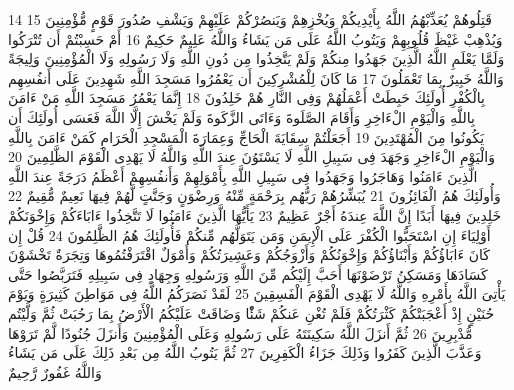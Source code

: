 \documentclass[20pt,a4paper]{article}
\begin{document}
{\tiny\colorbox{cl_aya}{14}} قَتِلُوهُمْ يُعَذِّبْهُمُ اللَّهُ بِأَيْدِيكُمْ وَيُخْزِهِمْ وَيَنصُرْكُمْ عَلَيْهِمْ وَيَشْفِ صُدُورَ قَوْمٍ مُّؤْمِنِينَ
{\tiny\colorbox{cl_aya}{15}} وَيُذْهِبْ غَيْظَ قُلُوبِهِمْ وَيَتُوبُ اللَّهُ عَلَى مَن يَشَاءُ وَاللَّهُ عَلِيمٌ حَكِيمٌ
{\tiny\colorbox{cl_aya}{16}} أَمْ حَسِبْتُمْ أَن تُتْرَكُوا وَلَمَّا يَعْلَمِ اللَّهُ الَّذِينَ جَهَدُوا مِنكُمْ وَلَمْ يَتَّخِذُوا مِن دُونِ اللَّهِ وَلَا رَسُولِهِ وَلَا الْمُؤْمِنِينَ وَلِيجَةً وَاللَّهُ خَبِيرٌ بِمَا تَعْمَلُونَ
{\tiny\colorbox{cl_aya}{17}} مَا كَانَ لِلْمُشْرِكِينَ أَن يَعْمُرُوا مَسَجِدَ اللَّهِ شَهِدِينَ عَلَى أَنفُسِهِم بِالْكُفْرِ أُولَئِكَ حَبِطَتْ أَعْمَلُهُمْ وَفِى النَّارِ هُمْ خَلِدُونَ
{\tiny\colorbox{cl_aya}{18}} إِنَّمَا يَعْمُرُ مَسَجِدَ اللَّهِ مَنْ ءَامَنَ بِاللَّهِ وَالْيَوْمِ الْءَاخِرِ وَأَقَامَ الصَّلَوةَ وَءَاتَى الزَّكَوةَ وَلَمْ يَخْشَ إِلَّا اللَّهَ فَعَسَى أُولَئِكَ أَن يَكُونُوا مِنَ الْمُهْتَدِينَ
{\tiny\colorbox{cl_aya}{19}} أَجَعَلْتُمْ سِقَايَةَ الْحَاجِّ وَعِمَارَةَ الْمَسْجِدِ الْحَرَامِ كَمَنْ ءَامَنَ بِاللَّهِ وَالْيَوْمِ الْءَاخِرِ وَجَهَدَ فِى سَبِيلِ اللَّهِ لَا يَسْتَوُنَ عِندَ اللَّهِ وَاللَّهُ لَا يَهْدِى الْقَوْمَ الظَّلِمِينَ
{\tiny\colorbox{cl_aya}{20}} الَّذِينَ ءَامَنُوا وَهَاجَرُوا وَجَهَدُوا فِى سَبِيلِ اللَّهِ بِأَمْوَلِهِمْ وَأَنفُسِهِمْ أَعْظَمُ دَرَجَةً عِندَ اللَّهِ وَأُولَئِكَ هُمُ الْفَائِزُونَ
{\tiny\colorbox{cl_aya}{21}} يُبَشِّرُهُمْ رَبُّهُم بِرَحْمَةٍ مِّنْهُ وَرِضْوَنٍ وَجَنَّتٍ لَّهُمْ فِيهَا نَعِيمٌ مُّقِيمٌ
{\tiny\colorbox{cl_aya}{22}} خَلِدِينَ فِيهَا أَبَدًا إِنَّ اللَّهَ عِندَهُ أَجْرٌ عَظِيمٌ
{\tiny\colorbox{cl_aya}{23}} يَأَيُّهَا الَّذِينَ ءَامَنُوا لَا تَتَّخِذُوا ءَابَاءَكُمْ وَإِخْوَنَكُمْ أَوْلِيَاءَ إِنِ اسْتَحَبُّوا الْكُفْرَ عَلَى الْإِيمَنِ وَمَن يَتَوَلَّهُم مِّنكُمْ فَأُولَئِكَ هُمُ الظَّلِمُونَ
{\tiny\colorbox{cl_aya}{24}} قُلْ إِن كَانَ ءَابَاؤُكُمْ وَأَبْنَاؤُكُمْ وَإِخْوَنُكُمْ وَأَزْوَجُكُمْ وَعَشِيرَتُكُمْ وَأَمْوَلٌ اقْتَرَفْتُمُوهَا وَتِجَرَةٌ تَخْشَوْنَ كَسَادَهَا وَمَسَكِنُ تَرْضَوْنَهَا أَحَبَّ إِلَيْكُم مِّنَ اللَّهِ وَرَسُولِهِ وَجِهَادٍ فِى سَبِيلِهِ فَتَرَبَّصُوا حَتَّى يَأْتِىَ اللَّهُ بِأَمْرِهِ وَاللَّهُ لَا يَهْدِى الْقَوْمَ الْفَسِقِينَ
{\tiny\colorbox{cl_aya}{25}} لَقَدْ نَصَرَكُمُ اللَّهُ فِى مَوَاطِنَ كَثِيرَةٍ وَيَوْمَ حُنَيْنٍ إِذْ أَعْجَبَتْكُمْ كَثْرَتُكُمْ فَلَمْ تُغْنِ عَنكُمْ شَئًْا وَضَاقَتْ عَلَيْكُمُ الْأَرْضُ بِمَا رَحُبَتْ ثُمَّ وَلَّيْتُم مُّدْبِرِينَ
{\tiny\colorbox{cl_aya}{26}} ثُمَّ أَنزَلَ اللَّهُ سَكِينَتَهُ عَلَى رَسُولِهِ وَعَلَى الْمُؤْمِنِينَ وَأَنزَلَ جُنُودًا لَّمْ تَرَوْهَا وَعَذَّبَ الَّذِينَ كَفَرُوا وَذَلِكَ جَزَاءُ الْكَفِرِينَ
{\tiny\colorbox{cl_aya}{27}} ثُمَّ يَتُوبُ اللَّهُ مِن بَعْدِ ذَلِكَ عَلَى مَن يَشَاءُ وَاللَّهُ غَفُورٌ رَّحِيمٌ
\end{document}
